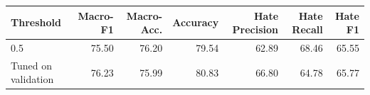 \begin{tabular}{lrrrrrr}
\toprule
Threshold & Macro-F1 & Macro-Acc. & Accuracy & Hate Precision & Hate Recall & Hate F1 \\
\midrule
0.5 & 75.50 & 76.20 & 79.54 & 62.89 & 68.46 & 65.55 \\
Tuned on validation & 76.23 & 75.99 & 80.83 & 66.80 & 64.78 & 65.77 \\
\bottomrule
\end{tabular}
